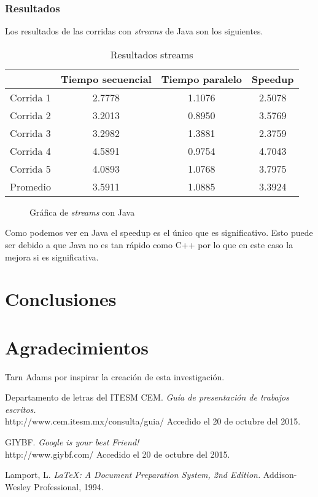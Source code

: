 \documentclass[10pt,letterpaper,oneside]{article}
\begin{document}
\subsubsection{Resultados}

Los resultados de las corridas con \textit{streams} de Java son los siguientes.

\begin{table}[H]
	\centering
	\begin{tabular}{|c|c|c|c|}
		\hline
			& Tiempo secuencial & Tiempo paralelo & Speedup \\
		\hline
			Corrida 1 & 2.7778 & 1.1076 & 2.5078 \\
			Corrida 2 & 3.2013 & 0.8950 & 3.5769 \\
			Corrida 3 & 3.2982 & 1.3881 & 2.3759 \\
			Corrida 4 & 4.5891 & 0.9754 & 4.7043 \\
			Corrida 5 & 4.0893 & 1.0768 & 3.7975 \\
		\hline
			Promedio & 3.5911 & 1.0885 & 3.3924 \\
		\hline
	\end{tabular}
	\caption{Resultados streams}
	\label{tab:streams}
\end{table}

\begin{figure}[H]
	\centering
	\caption{Gráfica de \textit{streams} con Java}
	\label{fig:plot_stream}	
\end{figure}

Como podemos ver en Java el speedup es el único que es significativo. Esto puede ser debido a que Java no es tan rápido como C++ por lo que en este caso la mejora si es significativa.

\section{Conclusiones}

\section{Agradecimientos}

Tarn Adams por inspirar la creación de esta investigación.
 
\begin{thebibliography}{9}
    
    Departamento de letras del ITESM CEM. 
    \emph{Guía de presentación de trabajos escritos.} \\
    http://www.cem.itesm.mx/consulta/guia/ Accedido el 20 de octubre del 2015.
    
    GIYBF. 
    \emph{Google is your best Friend!} \\
    http://www.giybf.com/ Accedido el 20 de octubre del 2015.
    
    Lamport, L. 
    \emph{\LaTeX: A Document Preparation System, 2nd Edition.} 
    Addison-Wesley Professional, 1994.

\end{thebibliography}
\end{document}
